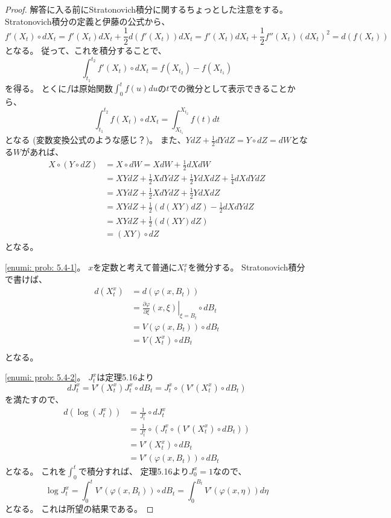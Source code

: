 \documentclass[uplatex]{jsarticle}
\theoremstyle{definition}
\begin{document}
\begin{proof}
  解答に入る前にStratonovich積分に関するちょっとした注意をする。
  Stratonovich積分の定義と伊藤の公式から、
  \[
  f'(X_t)\circ dX_t
  = f'(X_t)dX_t + \frac{1}{2}d\left( f'(X_t)\right) dX_t
  = f'(X_t)dX_t + \frac{1}{2}f''(X_t)(dX_t)^2
  = d\left( f(X_t) \right)
  \]
  となる。
  従って、これを積分することで、
  \[
  \int_{t_1}^{t_2}f'(X_t)\circ dX_t = f(X_{t_2}) - f(X_{t_1})
  \]
  を得る。
  とくに\(f\)は原始関数\(\int_0^t f(u)du\)の\(t\)での微分として表示できることから、
  \[
  \int_{t_1}^{t_2}f(X_t)\circ dX_t = \int_{X_{t_1}}^{X_{t_2}}f(t)dt
  \]
  となる (変数変換公式のような感じ？)。
  また、\(YdZ+\frac{1}{2}dYdZ = Y\circ dZ = dW\)となる\(W\)があれば、
  \begin{align*}
    X\circ (Y\circ dZ)
    &= X\circ dW = XdW + \frac{1}{2}dXdW \\
    &= XYdZ + \frac{1}{2}XdYdZ + \frac{1}{2}YdXdZ + \frac{1}{4}dXdYdZ \\
    &= XYdZ + \frac{1}{2}XdYdZ + \frac{1}{2}YdXdZ \\
    &= XYdZ + \frac{1}{2}(d(XY)dZ) - \frac{1}{2}dXdYdZ \\
    &= XYdZ + \frac{1}{2}(d(XY)dZ) \\
    &= (XY)\circ dZ
  \end{align*}
  となる。

  \ref{enumi: prob: 5.4-1}。
  \(x\)を定数と考えて普通に\(X_t^x\)を微分する。
  Stratonovich積分で書けば、
  \begin{align*}
    d(X_t^x)
    &= d\left( \varphi(x,B_t)\right) \\
    &= \left.\frac{\partial \varphi}{\partial\xi}
    (x,\xi)\right|_{\xi=B_t} \circ dB_t \\
    &= V(\varphi(x,B_t)) \circ dB_t \\
    &= V(X_t^x) \circ dB_t \\
  \end{align*}
  となる。

  \ref{enumi: prob: 5.4-2}。
  \(J_t^x\)は定理5.16より
  \[
  dJ_t^x = V'(X_t^x)J_t^x\circ dB_t
  = J_t^x\circ \left( V'(X_t^x)\circ dB_t\right)
  \]
  を満たすので、
  \begin{align*}
    d\left( \log(J_t^x)\right)
    &= \frac{1}{J_t^x}\circ dJ_t^x \\
    &= \frac{1}{J_t^x}\circ
    \left( J_t^x\circ \left( V'(X_t^x)\circ dB_t\right) \right) \\
    &= V'(X_t^x)\circ dB_t \\
    &= V'(\varphi(x,B_t))\circ dB_t
  \end{align*}
  となる。
  これを\(\int_0^t\)で積分すれば、
  定理5.16より\(J_0^x = 1\)なので、
  \[
  \log J_t^x = \int_0^t V'(\varphi(x,B_t))\circ dB_t
  = \int_0^{B_t} V'(\varphi(x,\eta)) d\eta
  \]
  となる。
  これは所望の結果である。
\end{proof}
\end{document}

